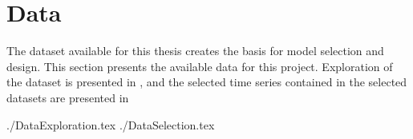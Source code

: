 \chapter{Data}
\label{section:Data}




The dataset available for this thesis creates the basis for model selection and design.
This section presents the available data for this project.
Exploration of the dataset is presented in ,
and the selected time series contained in the selected datasets are presented in 

{./DataExploration.tex}
{./DataSelection.tex}
